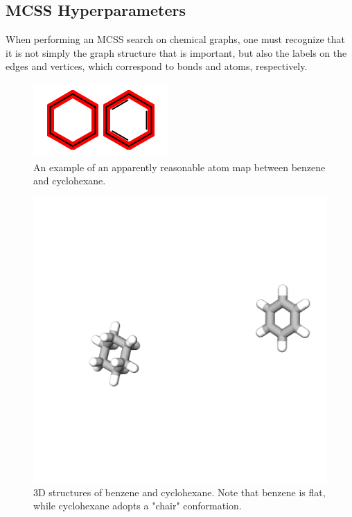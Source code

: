 \subsection{MCSS Hyperparameters}
%
When performing an MCSS search on chemical graphs, one must recognize that it is not simply the graph structure that is important, but also the labels on the edges and vertices, which correspond to bonds and atoms, respectively.
%
\begin{figure}
    \centering
    \includegraphics{benzene_cyclohexane_map.png}
    \caption{An example of an apparently reasonable atom map between benzene and cyclohexane.
    }
    \label{fig:benzene_cyclohexane_map}
\end{figure}
%
\begin{figure}
    \centering
    \includegraphics[width=1.0\textwidth]{cyclohex_ben_3d.png}
    \caption{3D structures of benzene and cyclohexane. Note that benzene is flat, while cyclohexane adopts a "chair" conformation.}
    \label{fig:benzene_cyclohexane_3D}
\end{figure}
